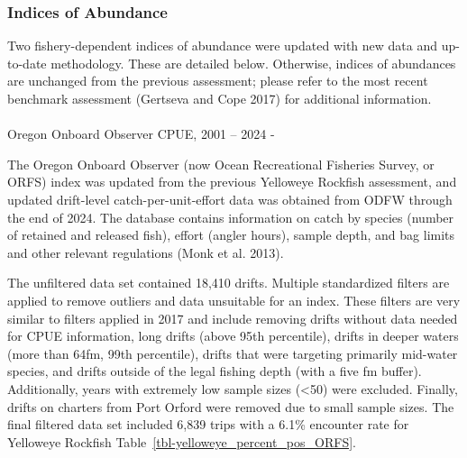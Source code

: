 \documentclass[
]{scrartcl}
\makeatletter
\let\oldparagraph\paragraph
\renewcommand{\paragraph}{
    \@ifstar
      \xxxParagraphStar
      \xxxParagraphNoStar
  }
\newcommand{\xxxParagraphStar}[1]{\oldparagraph*{#1}\mbox{}}
\newcommand{\xxxParagraphNoStar}[1]{\oldparagraph{#1}\mbox{}}
\makeatother
\begin{document}
\subsubsection{Indices of Abundance}\label{indices-of-abundance}

Two fishery-dependent indices of abundance were updated with new data
and up-to-date methodology. These are detailed below. Otherwise, indices
of abundances are unchanged from the previous assessment; please refer
to the most recent benchmark assessment (Gertseva and Cope 2017) for
additional information.

\paragraph{Oregon Onboard Observer CPUE, 2001 -- 2024
-}\label{oregon-onboard-observer-cpue-2001-2024--}

The Oregon Onboard Observer (now Ocean Recreational Fisheries Survey, or
ORFS) index was updated from the previous Yelloweye Rockfish assessment,
and updated drift-level catch-per-unit-effort data was obtained from
ODFW through the end of 2024. The database contains information on catch
by species (number of retained and released fish), effort (angler
hours), sample depth, and bag limits and other relevant regulations
(Monk et al. 2013).

The unfiltered data set contained 18,410 drifts. Multiple standardized
filters are applied to remove outliers and data unsuitable for an index.
These filters are very similar to filters applied in 2017 and include
removing drifts without data needed for CPUE information, long drifts
(above 95th percentile), drifts in deeper waters (more than 64fm, 99th
percentile), drifts that were targeting primarily mid-water species, and
drifts outside of the legal fishing depth (with a five fm buffer).
Additionally, years with extremely low sample sizes (\textless50) were
excluded. Finally, drifts on charters from Port Orford were removed due
to small sample sizes. The final filtered data set included 6,839 trips
with a 6.1\% encounter rate for Yelloweye Rockfish
Table~\ref{tbl-yelloweye_percent_pos_ORFS}.
\end{document}

